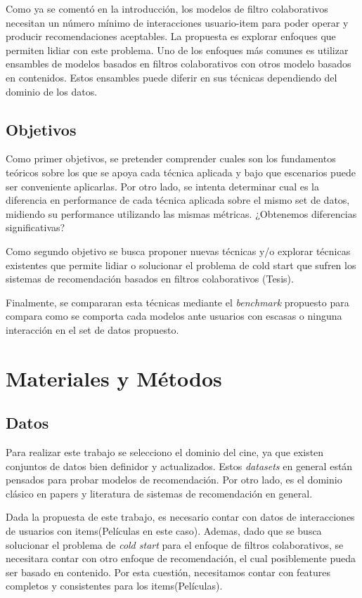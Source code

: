 \documentclass[11pt,a4paper,twoside]{thesis}
\begin{document}
Como ya se comentó en la introducción, los modelos de filtro colaborativos necesitan un número mínimo de interacciones usuario-item para poder operar y producir recomendaciones aceptables. La propuesta es explorar enfoques que permiten lidiar con este problema. Uno de los enfoques más comunes es utilizar ensambles de modelos basados en filtros colaborativos con otros modelo basados en contenidos. Estos ensambles puede diferir en sus técnicas dependiendo del dominio de los datos.

\section{Objetivos}

Como primer objetivos, se pretender comprender cuales son los fundamentos teóricos sobre los que se apoya cada técnica aplicada y bajo que escenarios puede ser conveniente aplicarlas. Por otro lado, se intenta determinar cual es la diferencia en performance de cada técnica aplicada sobre el mismo set de datos, midiendo su performance utilizando las mismas métricas. ¿Obtenemos diferencias significativas?

Como segundo objetivo se busca proponer nuevas técnicas y/o explorar técnicas existentes que permite lidiar o solucionar el problema de cold start que sufren los sistemas de recomendación basados en filtros colaborativos (Tesis).

Finalmente, se compararan esta técnicas mediante el \textit{benchmark} propuesto para compara como se comporta cada modelos ante usuarios con escasas o ninguna interacción en el set de datos propuesto.

\chapter{Materiales y Métodos}

\section{Datos} 

Para realizar este trabajo se selecciono el dominio del cine, ya que existen conjuntos de datos bien definidor y actualizados. 
Estos \textit{datasets} en general están pensados para probar modelos de recomendación. Por otro lado, es el dominio clásico en papers y literatura de sistemas de recomendación en general.

Dada la propuesta de este trabajo, es necesario contar con datos de interacciones de usuarios con items(Películas en este caso). Ademas, dado que se busca solucionar el problema de \textit{cold start} para el enfoque de filtros colaborativos, se necesitara contar con otro enfoque de recomendación, el cual posiblemente pueda ser basado en contenido. Por esta cuestión, necesitamos contar con features completos y consistentes para los items(Películas).
\end{document}
